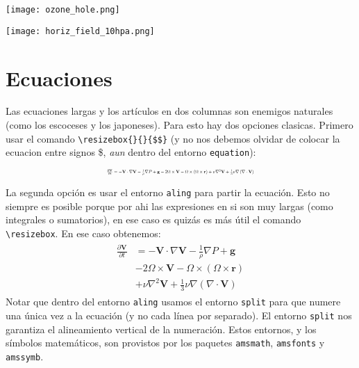 \documentclass[a4paper,10pt,twocolumn,twoside]{article}
\begin{document}
\begin{figure*}[t]
    \centering
    \texttt{[image: ozone\_hole.png]}
    \caption{Promedios diarios de la columna total de ozono en unidades Dobson para los días indicados. La isolínea de 220 UD se muestra en celeste punteado.}
    \label{fig:figura_2}
\end{figure*}

\begin{figure*}[p]
    \centering
    \texttt{[image: horiz\_field\_10hpa.png]}
    \caption{Series de campos horizontales en \SI{10}{\hecto\Pa} de $q$ (sombreado), $Z$ (contornos negros, cada \SI{500}{\meter}) y anomalía de $T$ (contornos coloreados, cada \SI{10}{\degreeCelsius}), en días seleccionados de agosto, septiembre y octubre del 2002 (1ra y 2da columna) y del 2019 (3ra y 4ta columna). Se muestra el valor de la isohipsa de \SI{29,5}{\km}. La isoterma de \SI{0}{\degreeCelsius} se muestra como una línea blanca gruesa.}
    \label{fig:figura_3}
\end{figure*}

\section{Ecuaciones}
Las ecuaciones largas y los artículos en dos columnas son enemigos naturales (como los escoceses y los japoneses). Para esto hay dos opciones clasicas. Primero usar el comando \verb+\resizebox{}{}{$$}+ (y no nos debemos olvidar de colocar la ecuacion entre signos \$, \emph{aun} dentro del entorno \texttt{equation}):

\begin{equation}
    \resizebox{0.44\textwidth}{!}{$\frac{\partial\mathbf{V}}{\partial t} = -\mathbf{V}\cdot\nabla\mathbf{V}-\frac{1}{\rho}\nabla P+\mathbf{g}-2\Omega\times\mathbf{V}-\Omega\times\left(\Omega\times\mathbf{r}\right)+\nu\nabla^2\mathbf{V}+\frac{1}{3}\nu\nabla\left(\nabla\cdot\mathbf{V}\right)$}
\end{equation}

La segunda opción es usar el entorno \texttt{aling} para partir la ecuación. Esto no siempre es posible porque por ahi las expresiones en si son muy largas (como integrales o sumatorios), en ese caso es quizás es más útil el comando \verb+\resizebox+. En ese caso obtenemos:
\begin{align}
\begin{split}
    \frac{\partial\mathbf{V}}{\partial t} & = -\mathbf{V}\cdot\nabla\mathbf{V}-\frac{1}{\rho}\nabla P+\mathbf{g} \\
     & - 2\Omega\times\mathbf{V}-\Omega\times\left(\Omega\times\mathbf{r}\right) \\
     & + \nu\nabla^2\mathbf{V}+\frac{1}{3}\nu\nabla\left(\nabla\cdot\mathbf{V}\right)
\end{split}
\end{align}
Notar que dentro del entorno \texttt{aling} usamos el entorno \texttt{split} para que numere una única vez a la ecuación (y no cada línea por separado). El entorno \texttt{split} nos garantiza el alineamiento vertical de la numeración. Estos entornos, y los símbolos matemáticos, son provistos por los paquetes \texttt{amsmath}, \texttt{amsfonts} y \texttt{amssymb}.
\end{document}
